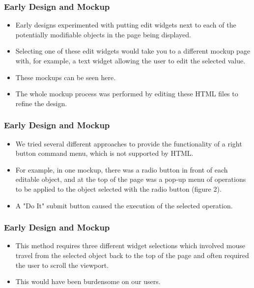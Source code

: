 \documentclass{beamer}
\begin{document}
\begin{frame}
\frametitle{Early Design and Mockup}

\begin{itemize}
\item Early designs experimented with putting edit widgets next to each of the potentially modifiable objects in the page being displayed.
\item Selecting one of these edit widgets would take you to a different mockup page with, for example, a text widget allowing the user to edit the selected value.
\item These mockups can be seen here.
\item The whole mockup process was performed by editing these HTML files to refine the design.
\end{itemize}

\end{frame}

\begin{frame}
\frametitle{Early Design and Mockup}

\begin{itemize}
\item We tried several different approaches to provide the functionality of a right button command menu, which is not supported by HTML.
\item For example, in one mockup, there was a radio button in front of each editable object, and at the top of the page was a pop-up menu of operations to be applied to the object selected with the radio button (figure 2).
\item A "Do It" submit button caused the execution of the selected operation.
\end{itemize}

\end{frame}

\begin{frame}
\frametitle{Early Design and Mockup}

\begin{itemize}
\item This method requires three different widget selections which involved mouse travel from the selected object back to the top of the page and often required the user to scroll the viewport.
\item This would have been burdensome on our users.
\end{itemize}

\end{frame}
\end{document}
